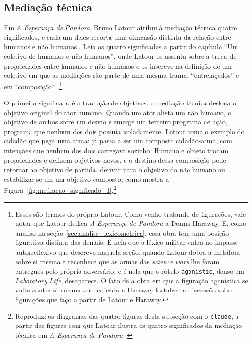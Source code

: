 \subsection{Mediação técnica}
\label{subsec:mediacao_quatro_significados}

Em \textit{A Esperança de Pandora}, Bruno Latour atribui à mediação técnica quatro significados, e cada um deles recorta uma dimensão distinta da relação entre humanos e não humanos \parencite{Latour2017Esperanca}. Leio os quatro significados a partir do capítulo \enquote{Um coletivo de humanos e não humanos}, onde Latour os assenta sobre a troca de propriedades entre humanos e não humanos e os inscreve na definição de um coletivo em que as mediações são parte de uma mesma trama, \enquote{entrelaçados} \parencite[p.~209]{Latour2017Esperanca} e em \enquote{composição} \parencite[p.~215]{Latour2017Esperanca}.\footnote{Esses são termos do próprio Latour. Como venho tratando de figurações, vale notar que Latour dedica \textit{A Esperança de Pandora} a Donna Haraway. E, como analiso na seção~\ref{sec:analise_lexicometrica}, essa obra tem uma posição figurativa distinta das demais. É nela que o léxico militar entra no impasse autorreflexivo que descrevo naquela seção, quando Latour dobra a metáfora sobre si mesma e reconhece que as armas das \textit{science wars} lhe foram entregues pelo próprio adversário, e é nela que o rótulo \texttt{agonistic}, denso em \emph{Laboratory Life}, desaparece. O fato de a obra em que a figuração agonística se volta contra si mesma ser dedicada a Haraway fortalece a discussão sobre figurações que faço a partir de Latour e Haraway.}

O primeiro significado é a tradução de objetivos: a mediação técnica desloca o objetivo original do ator humano. Quando um ator alista um não humano, o objetivo de ambos sofre um desvio e emerge um terceiro programa de ação, programa que nenhum dos dois possuía isoladamente. Latour toma o exemplo do cidadão que pega uma arma: já passa a ser um composto cidadão-arma, com intenções que nenhum dos dois carregava sozinho. Humano e objeto trocam propriedades e definem objetivos novos, e o destino dessa composição pode retornar ao objetivo de partida, derivar para o objetivo do não humano ou estabilizar-se em um objetivo composto, como mostra a Figura~\ref{fig:mediacao_significado_1}.\footnote{Reproduzi os diagramas das quatro figuras desta subseção com o \texttt{claude}, a partir das figuras com que Latour ilustra os quatro significados da mediação técnica em \textit{A Esperança de Pandora} \parencite[pp.~206--213]{Latour2017Esperanca}.}

